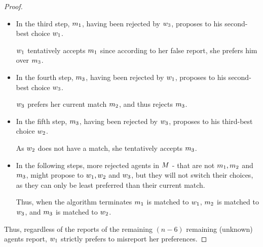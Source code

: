 \begin{proof}
\begin{itemize}
        \item In the third step, $m_1$, having been rejected by  $w_3$, proposes to his second-best choice $w_1$.

        $w_1$ tentatively accepts $m_1$ since according to her false report, she prefers him over $m_3$.

        
        \item In the fourth step, $m_3$, having been rejected by  $w_1$, proposes to his second-best choice $w_3$.

        $w_3$ prefers her current match $m_2$, and thus rejects $m_3$.


        \item In the fifth step, $m_3$, having been rejected by  $w_3$, proposes to his third-best choice $w_2$.

        As $w_2$ does not have a match, she tentatively accepts $m_3$.
        
        
        \item In the following steps, more rejected agents in $M$ - that are not $m_1, m_2$ and $m_3$, might propose to $w_1, w_2$ and $w_3$, but they will not switch their choices, as they can only be least preferred than their current match. 
        
        Thus, when the algorithm terminates $m_1$ is matched to $w_1$, $m_2$ is matched to $w_3$, and $m_3$ is matched to $w_2$. 
    \end{itemize}
    

    Thus, regardless of the reports of the remaining $(n-6)$ remaining (unknown) agents report, $w_1$ strictly prefers to misreport her preferences.
\end{proof}




